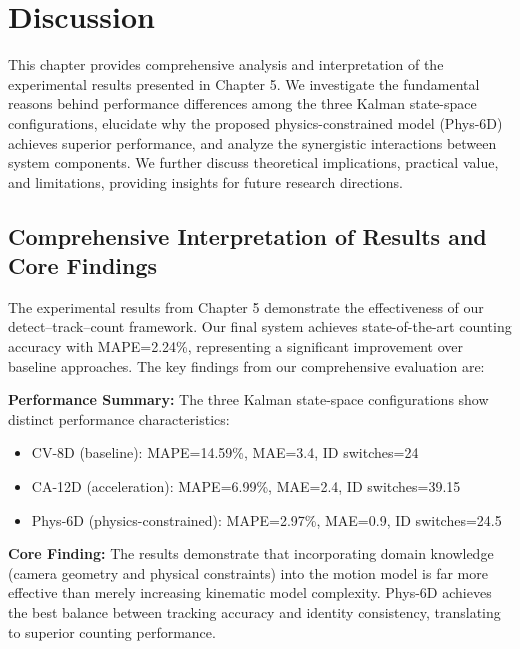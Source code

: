 \clearpage
\section{Discussion}\label{section::Discussion}


This chapter provides comprehensive analysis and interpretation of the experimental results presented in Chapter 5. We investigate the fundamental reasons behind performance differences among the three Kalman state-space configurations, elucidate why the proposed physics-constrained model (Phys-6D) achieves superior performance, and analyze the synergistic interactions between system components. We further discuss theoretical implications, practical value, and limitations, providing insights for future research directions.

\subsection{Comprehensive Interpretation of Results and Core Findings}

The experimental results from Chapter 5 demonstrate the effectiveness of our detect–track–count framework. Our final system achieves state-of-the-art counting accuracy with MAPE=2.24\%, representing a significant improvement over baseline approaches. The key findings from our comprehensive evaluation are:

\textbf{Performance Summary:} The three Kalman state-space configurations show distinct performance characteristics:
\begin{itemize}
    \item CV-8D (baseline): MAPE=14.59\%, MAE=3.4, ID switches=24
    \item CA-12D (acceleration): MAPE=6.99\%, MAE=2.4, ID switches=39.15
    \item Phys-6D (physics-constrained): MAPE=2.97\%, MAE=0.9, ID switches=24.5
\end{itemize}

\textbf{Core Finding:} The results demonstrate that incorporating domain knowledge (camera geometry and physical constraints) into the motion model is far more effective than merely increasing kinematic model complexity. Phys-6D achieves the best balance between tracking accuracy and identity consistency, translating to superior counting performance.

